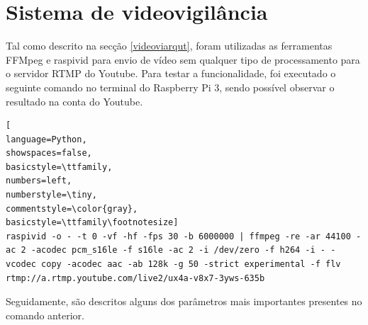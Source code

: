 












\section{Sistema de videovigilância}


Tal como descrito na secção \ref{videoviarqut}, foram utilizadas as ferramentas FFMpeg e raspivid para envio de vídeo sem qualquer tipo de processamento para o servidor \ac{RTMP} do Youtube. Para testar a funcionalidade, foi executado o seguinte comando no terminal do Raspberry Pi 3, sendo possível observar o resultado na conta do Youtube.


\begin{lstlisting}[
language=Python,
showspaces=false,
basicstyle=\ttfamily,
numbers=left,
numberstyle=\tiny,
commentstyle=\color{gray},
basicstyle=\ttfamily\footnotesize]
raspivid -o - -t 0 -vf -hf -fps 30 -b 6000000 | ffmpeg -re -ar 44100 -ac 2 -acodec pcm_s16le -f s16le -ac 2 -i /dev/zero -f h264 -i - -vcodec copy -acodec aac -ab 128k -g 50 -strict experimental -f flv rtmp://a.rtmp.youtube.com/live2/ux4a-v8x7-3yws-635b

\end{lstlisting}






Seguidamente, são descritos alguns dos parâmetros mais importantes presentes no comando anterior\cite{streamlive}. 


